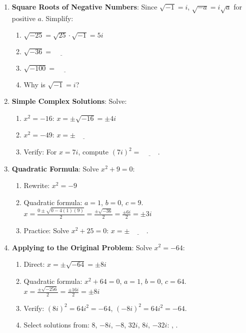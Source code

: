 \documentclass[12pt]{article}
\begin{document}
\begin{enumerate}[label=21.\arabic*]
    \item \textbf{Square Roots of Negative Numbers}: Since \( \sqrt{-1} = i \), \( \sqrt{-a} = i\sqrt{a} \) for positive \( a \). Simplify:
    \begin{enumerate}[label=\alph*)]
        \item \( \sqrt{-25} = \sqrt{25} \cdot \sqrt{-1} = 5i \)
        \item \( \sqrt{-36} = \underline{\hspace{1cm}} \)
        \item \( \sqrt{-100} = \underline{\hspace{1cm}} \)
        \item Why is \( \sqrt{-1} = i \)? \underline{\hspace{6cm}}
    \end{enumerate}
    \item \textbf{Simple Complex Solutions}: Solve:
    \begin{enumerate}[label=\alph*)]
        \item \( x^2 = -16 \): \( x = \pm \sqrt{-16} = \pm 4i \)
        \item \( x^2 = -49 \): \( x = \pm \underline{\hspace{1cm}} \)
        \item Verify: For \( x = 7i \), compute \( (7i)^2 = \underline{\hspace{1cm}} \).
    \end{enumerate}
    \item \textbf{Quadratic Formula}: Solve \( x^2 + 9 = 0 \):
    \begin{enumerate}[label=\alph*)]
        \item Rewrite: \( x^2 = -9 \)
        \item Quadratic formula: \( a = 1 \), \( b = 0 \), \( c = 9 \). \\
        \( x = \frac{0 \pm \sqrt{0 - 4(1)(9)}}{2} = \frac{\pm \sqrt{-36}}{2} = \frac{\pm 6i}{2} = \pm 3i \)
        \item Practice: Solve \( x^2 + 25 = 0 \): \( x = \pm \underline{\hspace{1cm}} \).
    \end{enumerate}
    \item \textbf{Applying to the Original Problem}: Solve \( x^2 = -64 \):
    \begin{enumerate}[label=\alph*)]
        \item Direct: \( x = \pm \sqrt{-64} = \pm 8i \)
        \item Quadratic formula: \( x^2 + 64 = 0 \), \( a = 1 \), \( b = 0 \), \( c = 64 \). \\
        \( x = \frac{\pm \sqrt{-256}}{2} = \frac{\pm 16i}{2} = \pm 8i \)
        \item Verify: \( (8i)^2 = 64i^2 = -64 \), \((-8i)^2 = 64i^2 = -64 \).
        \item Select solutions from: 8, \(-8i\), \(-8\), \(32i\), \(8i\), \(-32i\): \underline{\hspace{1cm}}, \underline{\hspace{1cm}}.
    \end{enumerate}
\end{enumerate}
\end{document}
